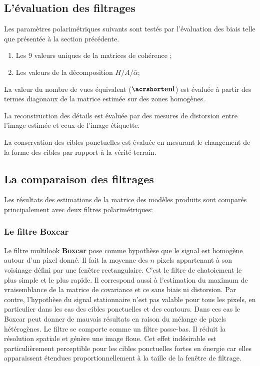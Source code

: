 \subsection{L'évaluation des filtrages}

Les paramètres polarimétriques suivants sont testés par l'évaluation des biais telle que présentée à la section précédente.

\begin{enumerate}
    \item Les 9 valeurs uniques de la matrices de cohérence \matcoh;
    \item Les valeurs de la décomposition $H/A/\bar{\alpha}$;
\end{enumerate}

La valeur du nombre de vues équivalent ($\acrenl$) est évaluée à partir des termes diagonaux de la matrice \matcoh estimée sur des zones homogènes.  

La reconstruction des détails est évaluée par des mesures de distorsion entre l'image estimée et ceux de l'image étiquette. 

La conservation des cibles ponctuelles est évaluée en mesurant le changement de la forme des cibles par rapport à la vérité terrain.

\subsection{La comparaison des filtrages}

Les résultats des estimations de la matrice \matcoh des modèles produits sont comparés principalement avec deux filtres polarimétriques:

\subsubsection{Le filtre Boxcar}

Le filtre multilook \textbf{Boxcar} pose comme hypothèse que le signal est homogène autour d'un pixel donné.  Il fait la moyenne des $n$ pixels appartenant à son voisinage défini par une fenêtre rectangulaire. C'est le filtre de chatoiement le plus simple et le plus rapide. Il correspond aussi à l’estimation du maximum de vraisemblance de la matrice de covariance et ce sans biais ni distorsion. Par contre, l'hypothèse du signal stationnaire n'est pas valable pour tous les pixels, en particulier dans les cas des cibles ponctuelles et des contours.  Dans ces cas le Boxcar peut donner de mauvais résultats en raison du mélange de pixels hétérogènes. Le filtre se comporte comme un filtre passe-bas. Il réduit la résolution spatiale et génère une image floue. Cet effet indésirable est particulièrement perceptible pour les cibles ponctuelles fortes en énergie car elles apparaissent étendues proportionnellement à la taille de la fenêtre de filtrage.


